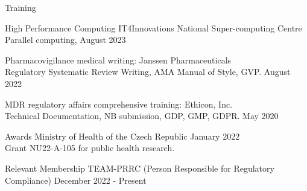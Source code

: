 \documentclass{resume}
\begin{document}
\begin{rSection}{Training}
\vspace{-1em}
    \item High Performance Computing \hfill{IT4Innovations National Super-computing Centre}\\
          Parallel computing,  \hfill August 2023
    \item Pharmacovigilance medical writing: \hfill {Janssen Pharmaceuticals}\\
          Regulatory Systematic Review Writing, AMA Manual of Style, GVP. \hfill August 2022
    \item MDR regulatory affairs comprehensive training: \hfill  {Ethicon, Inc.}\\
          Technical Documentation, NB submission, GDP, GMP, GDPR. \hfill May 2020
\end{rSection}

\begin{rSection}{Awards}
Ministry of Health of the Czech Republic \hfill January 2022\\
Grant NU22-A-105 for public health research.
\end{rSection}

\begin{rSection}{Relevant Membership} 
    TEAM-PRRC (Person Responsible for Regulatory Compliance) \hfill December 2022 - Present\\
\end{rSection}
\end{document}
